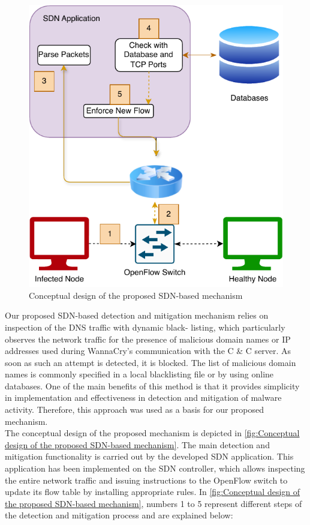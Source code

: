 \documentclass[12pt,letterpaper]{article}
\begin{document}
            \begin{figure}[h]
                \centering
                \includegraphics{images/ConceptDesign.drawio.pdf}
                \caption{Conceptual design of the proposed SDN-based mechanism}
                \label{fig:Conceptual design of the proposed SDN-based mechanism}
            \end{figure}

            Our proposed SDN-based detection and mitigation mechanism relies on inspection of the \ac{DNS} traffic with dynamic black- listing, which particularly observes the network traffic for the presence of malicious domain names or IP addresses used during WannaCry’s communication with the C \& C server. %
            As soon as such an attempt is detected, it is blocked. The list of malicious domain names is commonly specified in a local blacklisting file or by using online databases. One of the main benefits of this method is that it provides simplicity in implementation and effectiveness in detection and mitigation of malware activity. Therefore, this approach was used as a basis for our proposed mechanism.
\\
            The conceptual design of the proposed mechanism is depicted in \autoref{fig:Conceptual design of the proposed SDN-based mechanism}. The main detection and mitigation functionality is carried out by the developed SDN application. This application has been implemented on the SDN controller, which allows inspecting the entire network traffic and issuing instructions to the OpenFlow switch to update its flow table by installing appropriate rules. In \autoref{fig:Conceptual design of the proposed SDN-based mechanism}, numbers 1 to 5 represent different steps of the detection and mitigation process and are explained below:
\end{document}
